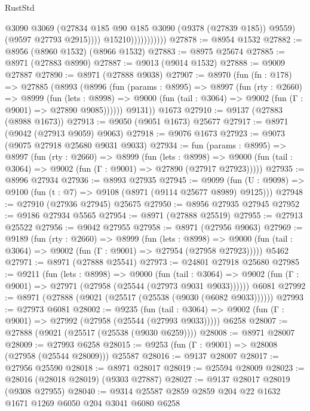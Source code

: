 \begin{lexlean}{RustStd}
\begin{coremodule}
                                @3090
                                @3069
                                (@27834 @185 @90 @185 @3090 (@9378 (@27839 @185)) @9559)
                                (@9597 @27793 @2915))))
                          @15210)))))))))))
@27878 := @8954 @1532
@27882 := @8956 (@8960 @1532) (@8966 @1532)
@27883 := @8975 @25674
@27885 := @8971 (@27883 @8990)
@27887 := @9013 (@9014 @1532)
@27888 := @9009 @27887
@27890 := @8971 (@27888 @9038)
@27907 := @8970
    (fun (fn : @178) =>
    @27885
      (@8993
        (@8996
          (fun (params : @8995) =>
          @8997
            (fun (rty : @2660) =>
            @8999
              (fun (lets : @8998) =>
              @9000 (fun (tail : @3064) => @9002 (fun (Γ : @9001) => @27890 @9085))))))
        @9131))
    @1673
@27910 := @9137 (@27883 (@8988 @1673))
@27913 := @9050 (@9051 @1673) @25677
@27917 := @8971 (@9042 (@27913 @9059) @9063)
@27918 := @9076 @1673
@27923 := @9073 (@9075 @27918 @25680 @9031 @9033)
@27934 := fun (params : @8995) =>
  @8997
    (fun (rty : @2660) =>
    @8999
      (fun (lets : @8998) =>
      @9000 (fun (tail : @3064) => @9002 (fun (Γ : @9001) => @27890 (@27917 @27923)))))
@27935 := @8996 @27934
@27936 := @8993 @27935
@27945 := @9099
    (fun (U : @9098) => @9100 (fun (t : @7) => @9108 (@8971 (@9114 @25677 @8989) @9125)))
@27948 := @27910 (@27936 @27945) @25675
@27950 := @8956 @27935 @27945
@27952 := @9186 @27934 @5565
@27954 := @8971 (@27888 @25519)
@27955 := @27913 @25522
@27956 := @9042 @27955
@27958 := @8971 (@27956 @9063)
@27969 := @9189
    (fun (rty : @2660) =>
    @8999
      (fun (lets : @8998) =>
      @9000 (fun (tail : @3064) => @9002 (fun (Γ : @9001) => @27954 (@27958 @27923)))))
    @5462
@27971 := @8971 (@27888 @25541)
@27973 := @24801 @27918 @25680
@27985 := @9211
    (fun (lets : @8998) =>
    @9000
      (fun (tail : @3064) =>
      @9002 (fun (Γ : @9001) => @27971 (@27958 (@25544 (@27973 @9031 @9033))))))
    @6081
@27992 := @8971 (@27888 (@9021 (@25517 (@25538 (@9030 (@6082 @9033))))))
@27993 := @27973 @6081
@28002 := @9235
    (fun (tail : @3064) => @9002 (fun (Γ : @9001) => @27992 (@27958 (@25544 (@27993 @9033)))))
    @6258
@28007 := @27888 (@9021 (@25517 (@25538 (@9030 @6259))))
@28008 := @8971 @28007
@28009 := @27993 @6258
@28015 := @9253 (fun (Γ : @9001) => @28008 (@27958 (@25544 @28009))) @25587
@28016 := @9137 @28007
@28017 := @27956 @25590
@28018 := @8971 @28017
@28019 := @25594 @28009
@28023 := @28016 (@28018 @28019) (@9303 @27887)
@28027 := @9137 @28017 @28019 (@9308 @27955)
@28040 := @9314 @25587 @2859 @2859 @204 @22 @1632 @1671 @1269 @6050 @204 @3041 @6080 @6258

\end{coremodule}
\end{lexlean}
